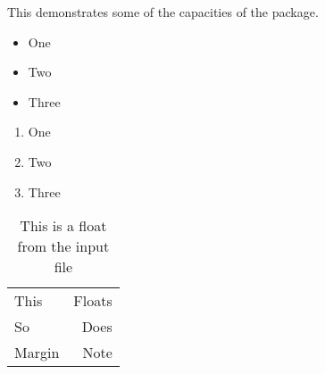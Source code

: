 This demonstrates some of the capacities of the package.

\begin{itemize}
\item One
\item Two
\item Three
\end{itemize}

\begin{enumerate}
\item One
\item Two
\item Three
\end{enumerate}

\begin{table}
  \centering
  \begin{tabular}{lr}
    This & Floats \\
    So & Does \\
    Margin & Note
  \end{tabular}
  \caption{This is a float from the input file}
\end{table}

